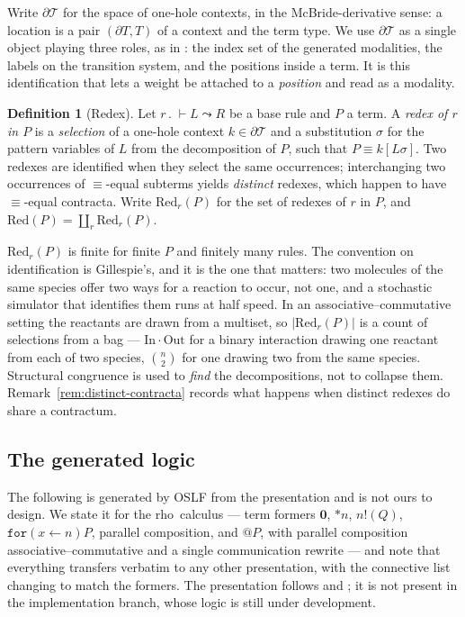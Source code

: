 \documentclass[11pt,a4paper]{article}
\theoremstyle{plain}
\theoremstyle{definition}
\newtheorem{definition}[theorem]{Definition}
\theoremstyle{remark}
\newcommand{\rhoc}{\textsf{rho}}
\newcommand{\Nil}{\mathbf{0}}
\newcommand{\Terms}{\mathcal{T}}
\newcommand{\Red}{\mathrm{Red}}
\begin{document}
Write $\partial \Terms$ for the space of one-hole contexts, in the McBride-derivative sense: a
location is a pair $(\partial T, T)$ of a context and the term type. We use $\partial \Terms$ as a
single object playing three roles, as in \cite{omnibus}: the index set of the generated modalities,
the labels on the transition system, and the positions inside a term. It is this identification that
lets a weight be attached to a \emph{position} and read as a modality.

\begin{definition}[Redex]
\label{def:redex}
Let $r \,.\; \vdash L \leadsto R$ be a base rule and $P$ a term. A \emph{redex of $r$ in $P$} is a
\emph{selection} of a one-hole context $k \in \partial\Terms$ and a substitution $\sigma$ for the
pattern variables of $L$ from the decomposition of $P$, such that $P \equiv k[L\sigma]$. Two redexes
are identified when they select the same occurrences; interchanging two occurrences of
$\equiv$-equal subterms yields \emph{distinct} redexes, which happen to have $\equiv$-equal
contracta. Write $\Red_r(P)$ for the set of redexes of $r$ in $P$, and
$\Red(P) = \coprod_r \Red_r(P)$.
\end{definition}

$\Red_r(P)$ is finite for finite $P$ and finitely many rules. The convention on identification is
Gillespie's, and it is the one that matters: two molecules of the same species offer two ways for a
reaction to occur, not one, and a stochastic simulator that identifies them runs at half speed. In
an associative--commutative setting the reactants are drawn from a multiset, so $|\Red_r(P)|$ is a
count of selections from a bag --- $\mathrm{In}\cdot\mathrm{Out}$ for a binary interaction drawing
one reactant from each of two species, $\binom{n}{2}$ for one drawing two from the same species.
Structural congruence is used to \emph{find} the decompositions, not to collapse them.
Remark~\ref{rem:distinct-contracta} records what happens when distinct redexes do share a contractum.

\subsection{The generated logic}
\label{sec:logic}

The following is generated by OSLF from the presentation and is not ours to design. We state it for
the \rhoc\ calculus --- term formers $\Nil$, $*n$, $n!(Q)$, $\texttt{for}(x \leftarrow n)P$,
parallel composition, and $@P$, with parallel composition associative--commutative and a single
communication rewrite --- and note that everything transfers verbatim to any other presentation,
with the connective list changing to match the formers. The presentation follows
\cite[\S2]{classifier} and \cite[\S3]{scientist}; it is not present in the implementation branch,
whose logic is still under development.
\end{document}
